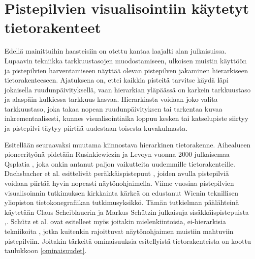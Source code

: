 \section{Pistepilvien visualisointiin käytetyt tietorakenteet}\label{kirjallisuus}

Edellä mainittuihin haasteisiin on otettu kantaa laajalti alan julkaisuissa. Lupaavin tekniikka tarkkuustasojen muodostamiseen, ulkoisen muistin käyttöön ja pistepilvien harventamiseen näyttää olevan pistepilven jakaminen hierarkiseen tietorakenteeseen. Ajatuksena on, ettei kaikkia pisteitä tarvitse käydä läpi jokaisella ruudunpäivityksellä, vaan hierarkian yläpäässä on karkein tarkkuustaso ja alaspäin kulkiessa tarkkuus kasvaa. Hierarkiasta voidaan joko valita tarkkuustaso, joka takaa nopean ruudunpäivityksen tai tarkentaa kuvaa inkrementaalisesti, kunnes visualisointiaika loppuu kesken tai katselupiste siirtyy ja pistepilvi täytyy piirtää uudestaan toisesta kuvakulmasta. 

Esitellään seuraavaksi muutama kiinnostava hierarkinen tietorakenne. Aihealueen pioneerityönä pidetään Rusinkiewiczin ja Levoyn vuonna 2000 julkaisemaa Qsplatia \cite{qsplat}, joka onkin antanut paljon vaikutteita uudemmille tietorakenteille. Dachsbacher et al. esittelivät peräkkäispistepuut \cite{spt}, joiden avulla pistepilviä voidaan piirtää hyvin nopeasti näytönohjaimella. Viime vuosina pistepilvien visualisoinnin tutkimuksen kirkkainta kärkeä on edustanut Wienin teknillisen yliopiston tietokonegrafiikan tutkimusyksikkö. Tämän tutkielman päälähteinä käytetään Claus Scheiblauerin ja Markus Schützin julkaisuja sisäkkäispistepuista \cite{scheiblauer},\cite{potree}. Schütz et al. ovat esitelleet myös joitakin mielenkiintoisia, ei-hierarkisia tekniikoita \cite{clod}, jotka kuitenkin rajoittuvat näytönohjaimen muistiin mahtuviin pistepilviin. Joitakin tärkeitä ominaisuuksia esitellyistä tietorakenteista on koottu taulukkoon \ref{ominaisuudet}.

